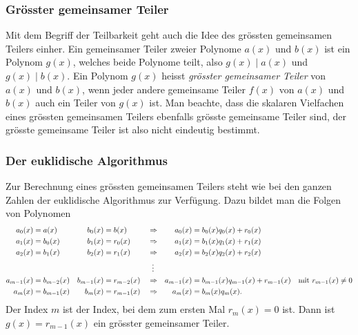 %
%
\subsubsection{Grösster gemeinsamer Teiler}
Mit dem Begriff der Teilbarkeit geht auch die Idee des grössten
gemeinsamen Teilers einher.
Ein gemeinsamer Teiler zweier Polynome $a(x)$ und $b(x)$ 
%
ist ein Polynom $g(x)$, welches beide Polynome teilt, also
$g(x)\mid a(x)$ und $g(x)\mid b(x)$.
%
Ein Polynom $g(x)$ heisst {\em grösster gemeinsamer Teiler} von $a(x)$
und $b(x)$, wenn jeder andere gemeinsame Teiler $f(x)$ von $a(x)$
und $b(x)$ auch ein Teiler von $g(x)$ ist.
Man beachte, dass die skalaren Vielfachen eines grössten gemeinsamen
Teilers ebenfalls grösste gemeinsame Teiler sind, der grösste gemeinsame
Teiler ist also nicht eindeutig bestimmt.

%
%
\subsubsection{Der euklidische Algorithmus}
%
%
Zur Berechnung eines grössten gemeinsamen Teilers steht wie bei den
ganzen Zahlen der euklidische Algorithmus zur Verfügung.
Dazu bildet man die Folgen von Polynomen
\[
\begin{aligned}
a_0(x)&=a(x) & b_0(x) &= b(x)
&
&\Rightarrow&
a_0(x)&=b_0(x) q_0(x) + r_0(x) &&
\\
a_1(x)&=b_0(x) & b_1(x) &= r_0(x)
&
&\Rightarrow&
a_1(x)&=b_1(x) q_1(x) + r_1(x) &&
\\
a_2(x)&=b_1(x) & b_2(x) &= r_1(x)
&
&\Rightarrow&
a_2(x)&=b_2(x) q_2(x) + r_2(x) &&
\\
&&&&&\hspace*{2mm}\vdots&&
\\
a_{m-1}(x)&=b_{m-2}(x) & b_{m-1}(x) &= r_{m-2}(x) 
&
&\Rightarrow&
a_{m-1}(x)&=b_{m-1}(x)q_{m-1}(x) + r_{m-1}(x) &\text{mit }r_{m-1}(x)&\ne 0
\\
a_m(x)&=b_{m-1}(x) & b_m(x)&=r_{m-1}(x)
&
&\Rightarrow&
a_m(x)&=b_m(x)q_m(x).&&
\end{aligned}
\]
Der Index $m$ ist der Index, bei dem zum ersten Mal $r_m(x)=0$ ist.
Dann ist $g(x)=r_{m-1}(x)$ ein grösster gemeinsamer Teiler.

%
%
